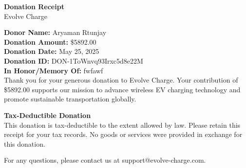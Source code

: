 \documentclass[a4paper,12pt]{article}
\begin{document}
\begin{center}
{\Large \textbf{Donation Receipt}}\\
\vspace{0.5cm}
Evolve Charge
\end{center}

\vspace{0.5cm}

\noindent
{\bf Donor Name:} Aryaman Rtunjay\\
{\bf Donation Amount:} \$5892.00\\
{\bf Donation Date:} May 25, 2025\\
{\bf Donation ID:} DON-1ToWnvq93Irxc5d8e22M\\
\noindent
{\bf In Honor/Memory Of:} fwfawf\\

\vspace{0.5cm}
\noindent
Thank you for your generous donation to Evolve Charge. Your contribution of \$5892.00 supports our mission to advance wireless EV charging technology and promote sustainable transportation globally.

\vspace{0.5cm}

\noindent
{\bf Tax-Deductible Donation}\\
This donation is tax-deductible to the extent allowed by law. Please retain this receipt for your tax records. No goods or services were provided in exchange for this donation.

\vspace{0.5cm}

\noindent
For any questions, please contact us at support@evolve-charge.com.
\end{document}
